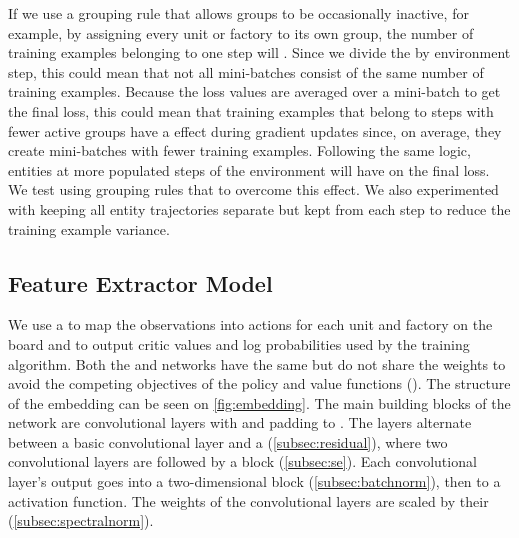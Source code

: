 \noindent If we use a grouping rule that allows groups to be occasionally inactive, for example, by assigning every unit or factory to its own group, the number of training examples belonging to one step will . Since we divide the  by environment step, this could mean that not all mini-batches consist of the same number of training examples. Because the loss values are averaged over a mini-batch to get the final loss, this could mean that training examples that belong to steps with fewer active groups have a  effect during gradient updates since, on average, they create mini-batches with fewer training examples. Following the same logic, entities at more populated steps of the environment will have  on the final loss. We test using grouping rules that  to overcome this effect. We also experimented with keeping all entity trajectories separate but kept  from each step to reduce the training example variance.


\subsection{Feature Extractor Model}
\label{sec:hybrid-network-architecture}

\noindent We use a  to map the observations into actions for each unit and factory on the board and to output critic values and log probabilities used by the training algorithm. Both the  and  networks have the same  but do not share the weights to avoid the competing objectives of the policy and value functions (\cite{shengyi2022the37implementation}). The structure of the embedding can be seen on \autoref{fig:embedding}. The main building blocks of the network are convolutional layers with  and padding to . The layers alternate between a basic convolutional layer and a  (\autoref{subsec:residual}), where two convolutional layers are followed by a  block (\autoref{subsec:se}). Each convolutional layer's output goes into a two-dimensional  block (\autoref{subsec:batchnorm}), then to a  activation function. The weights of the convolutional layers are scaled by their  (\autoref{subsec:spectralnorm}).

